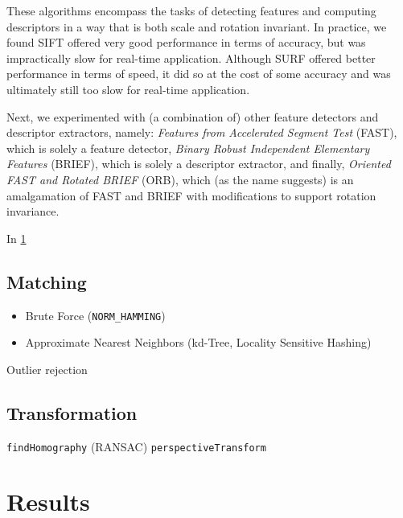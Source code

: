 \documentclass[11pt]{article} %
\theoremstyle{plain}
\theoremstyle{definition}
\theoremstyle{remark}
\numberwithin{equation}{section} %
\numberwithin{figure}{section} %
\numberwithin{table}{section} %
\begin{document}
These algorithms encompass the tasks of detecting features and computing descriptors
in a way that is both scale and rotation invariant. In practice, we found SIFT offered
very good performance in terms of accuracy, but was impractically slow for real-time 
application. Although SURF offered better performance in terms of speed, it did so at
the cost of some accuracy and was ultimately still too slow for real-time application.

Next, we experimented with (a combination of) other feature detectors and descriptor 
extractors, namely: \emph{Features from Accelerated Segment Test} (FAST), which is
solely a feature detector, \emph{Binary Robust Independent Elementary Features} (BRIEF),
which is solely a descriptor extractor, and finally, \emph{Oriented FAST and Rotated BRIEF}
(ORB), which (as the name suggests) is an amalgamation of FAST and BRIEF with 
modifications to support rotation invariance.


In \cref{sec:results}

\subsection{Matching}

\begin{itemize}
	\item Brute Force (\texttt{NORM\_HAMMING})
	\item Approximate Nearest Neighbors (kd-Tree, Locality Sensitive Hashing) 
\end{itemize}

Outlier rejection

\subsection{Transformation}

\texttt{findHomography} (RANSAC)
\texttt{perspectiveTransform}

\section{Results} \label{sec:results}



\end{document}

